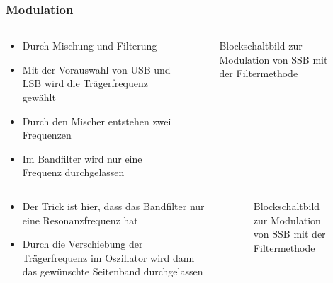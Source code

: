 \begin{frame}
\frametitle{Modulation}
\begin{columns}
    \begin{column}{0.48\textwidth}
    \begin{itemize}
  \item Durch Mischung und Filterung
  \item Mit der Vorauswahl von USB und LSB wird die Trägerfrequenz gewählt
  \item Durch den Mischer entstehen zwei Frequenzen
  \item Im Bandfilter wird nur eine Frequenz durchgelassen
  \end{itemize}

    \end{column}
   \begin{column}{0.48\textwidth}
       
\begin{figure}
    \caption{\scriptsize Blockschaltbild zur Modulation von SSB mit der Filtermethode}
    \label{e_ssb_modulation}
\end{figure}


   \end{column}
\end{columns}

\end{frame}

\begin{frame}
\begin{columns}
    \begin{column}{0.48\textwidth}
    \begin{itemize}
  \item Der Trick ist hier, dass das Bandfilter nur eine Resonanzfrequenz hat
  \item Durch die Verschiebung der Trägerfrequenz im Oszillator wird dann das gewünschte Seitenband durchgelassen
  \end{itemize}

    \end{column}
   \begin{column}{0.48\textwidth}
       
\begin{figure}
    \caption{\scriptsize Blockschaltbild zur Modulation von SSB mit der Filtermethode}
    \label{e_ssb_modulation}
\end{figure}


   \end{column}
\end{columns}

\end{frame}

